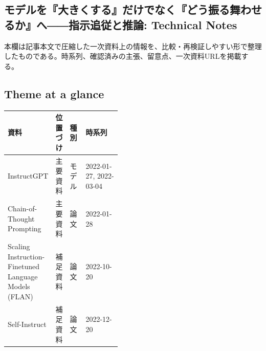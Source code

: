 \subsection*{モデルを『大きくする』だけでなく『どう振る舞わせるか』へ――指示追従と推論: Technical Notes}
本欄は記事本文で圧縮した一次資料上の情報を、比較・再検証しやすい形で整理したものである。時系列、確認済みの主張、留意点、一次資料URLを掲載する。
\smallskip
{}\par
\medskip
\subsection*{Theme at a glance}
\begin{center}
\footnotesize
\begin{tabularx}{\linewidth}{@{}p{0.20\linewidth}p{0.10\linewidth}p{0.14\linewidth}X@{}}
\toprule
資料 & 位置づけ & 種別 & 時系列 \\
\midrule
InstructGPT & 主要資料 & モデル & 2022-01-27, 2022-03-04 \\
Chain-of-Thought Prompting & 主要資料 & 論文 & 2022-01-28 \\
Scaling Instruction-Finetuned Language Models (FLAN) & 補足資料 & 論文 & 2022-10-20 \\
Self-Instruct & 補足資料 & 論文 & 2022-12-20 \\
\bottomrule
\end{tabularx}
\end{center}
\normalsize

